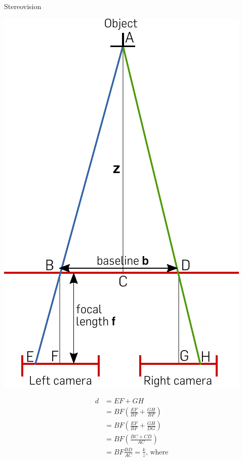 \documentclass[compress]{beamer}
\begin{document}
\begin{frame}{Stereovision}
{\begin{multicols}{2}
            \begin{center}
                \includegraphics[height=0.8\paperheight]{stereo}
            \end{center}

            \begin{align}
                d & = EF + GH                                        \\
                  & = BF (\frac{EF}{BF} + \frac{GH}{BF})             \\
                  & = BF (\frac{EF}{BF} + \frac{GH}{DG})             \\
                  & = BF (\frac{BC + CD}{AC})                        \\
                  & = BF \frac{BD}{AC} = \frac{k}{z}  \text{, where}
            \end{align}


\end{multicols}}
\end{frame}
\end{document}
